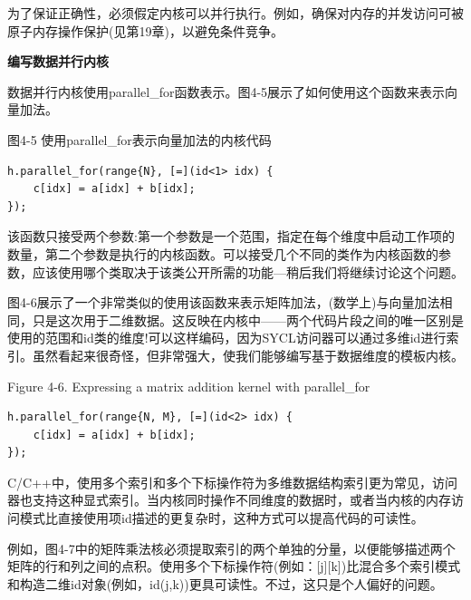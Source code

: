 为了保证正确性，必须假定内核可以并行执行。例如，确保对内存的并发访问可被原子内存操作保护(见第19章)，以避免条件竞争。\par

\hspace*{\fill} \par %
\textbf{编写数据并行内核}

数据并行内核使用parallel\_for函数表示。图4-5展示了如何使用这个函数来表示向量加法。\par

\hspace*{\fill} \par %
图4-5 使用parallel\_for表示向量加法的内核代码
\begin{lstlisting}[caption={}]
h.parallel_for(range{N}, [=](id<1> idx) {
	c[idx] = a[idx] + b[idx];
});
\end{lstlisting}

该函数只接受两个参数:第一个参数是一个范围，指定在每个维度中启动工作项的数量，第二个参数是执行的内核函数。可以接受几个不同的类作为内核函数的参数，应该使用哪个类取决于该类公开所需的功能—稍后我们将继续讨论这个问题。\par

图4-6展示了一个非常类似的使用该函数来表示矩阵加法，(数学上)与向量加法相同，只是这次用于二维数据。这反映在内核中——两个代码片段之间的唯一区别是使用的范围和id类的维度!可以这样编码，因为SYCL访问器可以通过多维id进行索引。虽然看起来很奇怪，但非常强大，使我们能够编写基于数据维度的模板内核。\par

\hspace*{\fill} \par %
Figure 4-6. Expressing a matrix addition kernel with parallel\_for
\begin{lstlisting}[caption={}]
h.parallel_for(range{N, M}, [=](id<2> idx) {
	c[idx] = a[idx] + b[idx];
});
\end{lstlisting}

C/C++中，使用多个索引和多个下标操作符为多维数据结构索引更为常见，访问器也支持这种显式索引。当内核同时操作不同维度的数据时，或者当内核的内存访问模式比直接使用项id描述的更复杂时，这种方式可以提高代码的可读性。\par

例如，图4-7中的矩阵乘法核必须提取索引的两个单独的分量，以便能够描述两个矩阵的行和列之间的点积。使用多个下标操作符(例如：[j][k])比混合多个索引模式和构造二维id对象(例如，id(j,k))更具可读性。不过，这只是个人偏好的问题。\par

